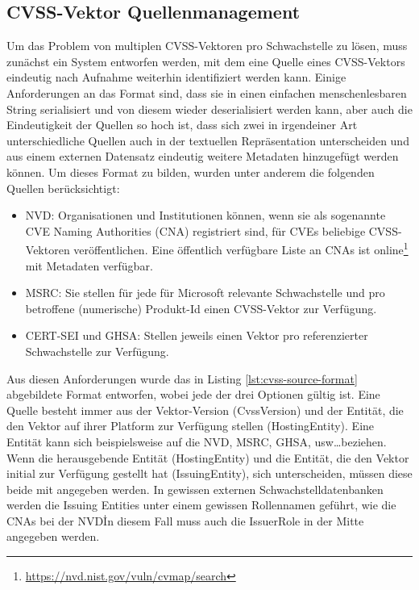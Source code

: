 \subsection{CVSS-Vektor Quellenmanagement} \label{subsec:projektbericht-loesungsweg-cvss-source-management}

Um das Problem von multiplen CVSS-Vektoren pro Schwachstelle zu lösen, muss zunächst ein System entworfen werden, mit dem eine Quelle eines CVSS-Vektors eindeutig nach Aufnahme weiterhin identifiziert werden kann.
Einige Anforderungen an das Format sind, dass sie in einen einfachen menschenlesbaren String serialisiert und von diesem wieder deserialisiert werden kann, aber auch die Eindeutigkeit der Quellen so hoch ist, dass sich zwei in irgendeiner Art unterschiedliche Quellen auch in der textuellen Repräsentation unterscheiden und aus einem externen Datensatz eindeutig weitere Metadaten hinzugefügt werden können.
Um dieses Format zu bilden, wurden unter anderem die folgenden Quellen berücksichtigt:

\begin{itemize}
    \item NVD:
    Organisationen und Institutionen können, wenn sie als sogenannte CVE Naming Authorities (CNA) registriert sind, für CVEs beliebige CVSS-Vektoren veröffentlichen.
    Eine öffentlich verfügbare Liste an CNAs ist online\footnote{\url{https://nvd.nist.gov/vuln/cvmap/search}} mit Metadaten verfügbar.
    \item MSRC:
    Sie stellen für jede für Microsoft relevante Schwachstelle und pro betroffene (numerische) Produkt-Id einen CVSS-Vektor zur Verfügung.
    \item CERT-SEI und GHSA: Stellen jeweils einen Vektor pro referenzierter Schwachstelle zur Verfügung.
\end{itemize}

Aus diesen Anforderungen wurde das in Listing \ref{lst:cvss-source-format} abgebildete Format entworfen, wobei jede der drei Optionen gültig ist.
Eine Quelle besteht immer aus der Vektor-Version (CvssVersion) und der Entität, die den Vektor auf ihrer Platform zur Verfügung stellen (HostingEntity).
Eine Entität kann sich beispielsweise auf die NVD, MSRC, GHSA, usw\ldots beziehen.
Wenn die herausgebende Entität (HostingEntity) und die Entität, die den Vektor initial zur Verfügung gestellt hat (IssuingEntity), sich unterscheiden, müssen diese beide mit angegeben werden.
In gewissen externen Schwachstelldatenbanken werden die Issuing Entities unter einem gewissen Rollennamen geführt, wie die CNAs bei der NVD\.
In diesem Fall muss auch die IssuerRole in der Mitte angegeben werden.

